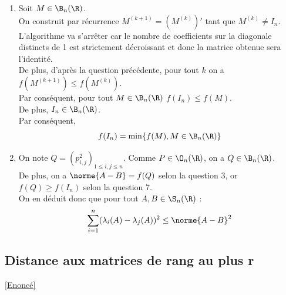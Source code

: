 \documentclass[8pt]{book}
\begin{document}
\begin{enumerate}[leftmargin=*]
		En itérant l'opération, on obtient une suite de matrices de $\B_n(\R)$ telle que $f(M)\geq f(M_1)\geq \dots \geq f(M_p)$.\\
		Puisque le nombre de coefficients sur la colonne $i_0$ et la ligne $i_0$ est finie, le procédé va s'arrêter. La matrice $M'$ alors obtenue vérifiera $M'\in\B_n(\R)$, $f(M)\geq f(M')$ et $m'_{i_0,i_0}=1$ et $m'_{i,i}=m_{i,i}=1$ si $i\leq i_0$.
		\item Soit $M\in\B_n(\R)$.\\
		On construit par récurrence $M^{(k+1)}=(M^{(k)})'$ tant que $M^{(k)}\ne I_n$.\\
		L'algorithme va s'arrêter car le nombre de coefficients sur la diagonale distincts de 1 est strictement décroissant et donc la matrice obtenue sera l'identité.\\
		De plus, d'après la question précédente, pour tout $k$ on a $f(M^{(k+1)})\leq f(M^{(k)})$.\\
		Par conséquent, pour tout $M\in\B_n(\R)$ $f(I_n)\leq f(M)$.\\
		De plus, $I_n\in\B_n(\R)$.\\
		Par conséquent, \[f(I_n)=\min\{f(M), M\in\B_n(\R)\}\]
		\item On note $Q=(p_{i,j}^2)_{1\leq i,j\leq n}$. Comme $P\in\O_n(\R)$, on a $Q\in\B_n(\R)$.\\
		De plus, on a $\norme{A-B}=f(Q)$ selon la question 3, or $f(Q)\geq f(I_n)$ selon la question 7.\\
		On en déduit donc que pour tout $A,B\in \S_n(\R)$ : 
		\[\sum_{i=1}^{n}(\lambda_i(A)-\lambda_j(A))^2\leq \norme{A-B}^2\]
		\end{enumerate}
	
	\subsection{Distance aux matrices de rang au plus r}
	\label{Distance aux matrices de rang au plus r corrigé}
	\textcolor{blue}{\hyperref[Distance aux matrices de rang au plus r]{[Enoncé]}}
	
\end{document}
